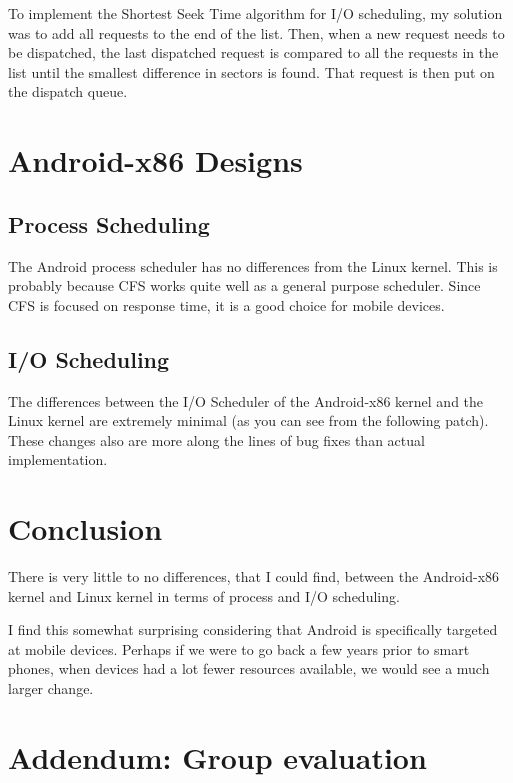 \documentclass[letterpaper,10pt,titlepage]{article}
\begin{document}
To implement the Shortest Seek Time algorithm for I/O scheduling, my
solution was to add all requests to the end of the list. Then, when a
new request needs to be dispatched, the last dispatched request is
compared to all the requests in the list until the smallest difference
in sectors is found. That request is then put on the dispatch queue.

\section{Android-x86 Designs}

\subsection*{Process Scheduling}

The Android process scheduler has no differences from the Linux kernel.
This is probably because  CFS works quite well as a general purpose
scheduler. Since CFS is focused on response time, it is a good choice
for mobile devices.

\subsection*{I/O Scheduling}

The differences between the I/O Scheduler of the Android-x86 kernel and
the Linux kernel are extremely minimal (as you can see from the
following patch). These changes also are more along the lines of bug
fixes than actual implementation.



\section{Conclusion}

There is very little to no differences, that I could find, between the
Android-x86 kernel and Linux kernel in terms of process and I/O
scheduling.

I find this somewhat surprising considering that Android is specifically
targeted at mobile devices. Perhaps if we were to go back a few years
prior to smart phones, when devices had a lot fewer resources available,
we would see a much larger change.

\section*{Addendum: Group evaluation}
\end{document}
